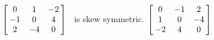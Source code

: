 {$\left[\hskip -3pt \begin{array}{ccc} 0&1&-2\\  -1&0&4
\\  2&-4&0\end{array}\hskip -3pt \right]$} 
{\tta\ is skew symmetric. $\left[\hskip -3pt \begin{array}{ccc} 0&-1&2\\  1&0&-4\\  -2&4&0\end{array}\hskip -3pt \right]
$}


  

